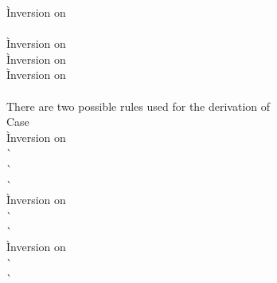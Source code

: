 \begin{description}
\begin{tabbing}
    \` Inversion on  \\
   \\
    \` Inversion on  \\
    \` Inversion on  \\
    \` Inversion on  \\
  \\
  There are two possible rules used for the derivation of  \\
  Case  \+ \\
      \` Inversion on  \\
      \`  \\
      \`  \\
      \`  \\
      \` Inversion on  \\
      \`  \\
      \`  \\
      \` Inversion on  \\
      \`  \\
      \`  \\
    \\

\end{tabbing}
\end{description}
